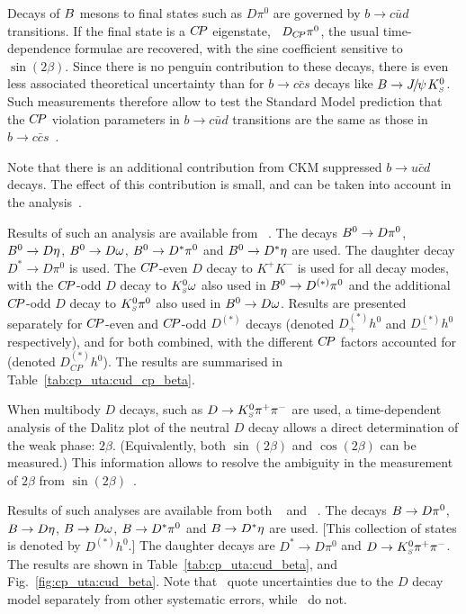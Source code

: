 \clearpage
{}
\label{sec:cp_uta:cud_beta}

Decays of $B$ mesons to final states such as $D\pi^0$ are 
governed by $b \to c\bar{u}d$ transitions. 
If the final state is a $C\!P$ eigenstate, \eg\ $D_{C\!P}\pi^0$, 
the usual time-dependence formulae are recovered, 
with the sine coefficient sensitive to $\sin(2\beta)$. 
Since there is no penguin contribution to these decays, 
there is even less associated theoretical uncertainty 
than for $b \to c\bar{c}s$ decays like $B \to {J\mskip -3mu/\mskip -2mu\psi\mskip 2mu} K^0_{\scriptscriptstyle S}$.
Such measurements therefore allow to test the Standard Model prediction
that the $C\!P$ violation parameters in $b \to c\bar{u}d$ transitions
are the same as those in $b \to c\bar{c}s$~\cite{Grossman:1996ke}.

Note that there is an additional contribution from CKM suppressed
$b \to u \bar{c} d$ decays.
The effect of this contribution is small, and can be taken into 
account in the analysis~\cite{Fleischer:2003ai,Fleischer:2003aj}.

Results of such an analysis are available from \babar~\cite{Aubert:2007mn}.
The decays $B^0 \to D\pi^0$, $B^0 \to D\eta$, $B^0 \to D\omega$,
$B^0 \to D^*\pi^0$ and $B^0 \to D^*\eta$ are used.
The daughter decay $D^* \to D\pi^0$ is used.
The $C\!P$-even $D$ decay to $K^+K^-$ is used for all decay modes,
with the $C\!P$-odd $D$ decay to $K^0_{\scriptscriptstyle S}\omega$ also used in $B^0 \to D^{(*)}\pi^0$
and the additional $C\!P$-odd $D$ decay to $K^0_{\scriptscriptstyle S}\pi^0$ 
also used in $B^0 \to D\omega$.
Results are presented separately for $C\!P$-even and $C\!P$-odd 
$D^{(*)}$ decays (denoted $D^{(*)}_+ h^0$ and $D^{(*)}_- h^0$ respectively),
and for both combined, with the different $C\!P$ factors accounted for
(denoted $D^{(*)}_{CP} h^0$).
The results are summarised in Table~\ref{tab:cp_uta:cud_cp_beta}.



When multibody $D$ decays, such as $D \to K^0_{\scriptscriptstyle S}\pi^+\pi^-$ are used, 
a time-dependent analysis of the Dalitz plot of the neutral $D$ decay 
allows a direct determination of the weak phase: $2\beta$. 
(Equivalently, both $\sin(2\beta)$ and $\cos(2\beta)$ can be measured.)
This information allows to resolve the ambiguity in the 
measurement of $2\beta$ from $\sin(2\beta)$~\cite{Bondar:2005gk}.

Results of such analyses are available from both 
\belle~\cite{Krokovny:2006sv} and \babar~\cite{Aubert:2007rp}.
The decays $B \to D\pi^0$, $B \to D\eta$, $B \to D\omega$, 
$B \to D^*\pi^0$ and $B \to D^*\eta$ are used. 
[This collection of states is denoted by $D^{(*)}h^0$.]
The daughter decays are $D^* \to D\pi^0$ and $D \to K^0_{\scriptscriptstyle S}\pi^+\pi^-$.
The results are shown in Table~\ref{tab:cp_uta:cud_beta},
and Fig.~\ref{fig:cp_uta:cud_beta}.
Note that \babar\ quote uncertainties due to the $D$ decay model 
separately from other systematic errors, while \belle\ do not.

